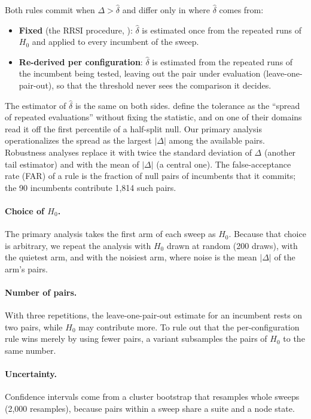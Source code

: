 Both rules commit when $\Delta > \hat\delta$ and differ only in where
$\hat\delta$ comes from:
\begin{itemize}
  \item \textbf{Fixed} (the RRSI procedure, \citealp{xia2026rrsi}):
  $\hat\delta$ is estimated once from the repeated runs of $H_0$ and applied to
  every incumbent of the sweep.
  \item \textbf{Re-derived per configuration}: $\hat\delta$ is estimated from the
  repeated runs of the incumbent being tested, leaving out the pair under
  evaluation (leave-one-pair-out), so that the threshold never sees the
  comparison it decides.
\end{itemize}
The estimator of $\hat\delta$ is the same on both sides. \citet{xia2026rrsi} define the tolerance as the ``spread of repeated evaluations'' without fixing the statistic, and on one of their domains read it off the first percentile of a half-split null. Our primary analysis operationalizes the spread as the largest $|\Delta|$ among the available pairs. Robustness analyses replace it with
twice the standard deviation of $\Delta$ (another tail estimator) and with the
mean of $|\Delta|$ (a central one). The false-acceptance rate (FAR) of a rule is
the fraction of null pairs of incumbents that it commits; the 90 incumbents
contribute 1{,}814 such pairs.

\paragraph{Choice of $H_0$.} The primary analysis takes the first arm of each
sweep as $H_0$. Because that choice is arbitrary, we repeat the analysis with
$H_0$ drawn at random (200 draws), with the quietest arm, and with the noisiest
arm, where noise is the mean $|\Delta|$ of the arm's pairs.

\paragraph{Number of pairs.} With three repetitions, the leave-one-pair-out
estimate for an incumbent rests on two pairs, while $H_0$ may contribute more.
To rule out that the per-configuration rule wins merely by using fewer pairs,
a variant subsamples the pairs of $H_0$ to the same number.

\paragraph{Uncertainty.} Confidence intervals come from a cluster bootstrap that
resamples whole sweeps (2{,}000 resamples), because pairs within a sweep share a
suite and a node state.

